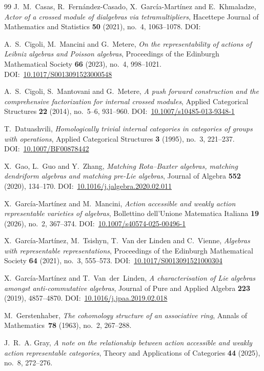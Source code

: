 \documentclass[reqno,a4paper]{amsart}
\renewcommand{\doi}[1]{DOI:~\href{https://doi.org/#1}{#1}}
\theoremstyle{plain}
\theoremstyle{definition}
\theoremstyle{remark}
\numberwithin{equation}{section}
\begin{document}
\begin{thebibliography}{99}
J.~M.~Casas, R.~Fernández-Casado, X.~García-Martínez and E.~Khmaladze, \emph{Actor of a crossed module of dialgebras via tetramultipliers}, Hacettepe Journal of Mathematics and Statistics \textbf{50} (2021), no.~4, 1063--1078. \doi{}

A.~S.~Cigoli, M.~Mancini and G.~Metere, \emph{On the representability of actions of Leibniz algebras and Poisson algebras}, Proceedings of the Edinburgh Mathematical Society \textbf{66} (2023), no.~4, 998--1021. \doi{10.1017/S0013091523000548}

A.~S.~Cigoli, S.~Mantovani and G.~Metere, \emph{A push forward construction and the comprehensive factorization for internal crossed modules}, Applied Categorical Structures \textbf{22} (2014), no.~5--6, 931--960. \doi{10.1007/s10485-013-9348-1}

T.~Datuashvili, \emph{Homologically trivial internal categories in categories of groups with operations}, Applied Categorical Structures \textbf{3} (1995), no.~3, 221--237.
\doi{10.1007/BF00878442}

X.~Gao, L.~Guo and Y.~Zhang, \emph{Matching Rota--Baxter algebras, matching dendriform algebras and matching pre-Lie algebras}, Journal of Algebra \textbf{552} (2020), 134--170. \doi{10.1016/j.jalgebra.2020.02.011}

X.~García-Martínez and M.~Mancini, \emph{Action accessible and weakly action representable varieties of algebras}, Bollettino dell'Unione Matematica Italiana \textbf{19} (2026), no.~2, 367--374. \doi{10.1007/s40574-025-00496-1}

X.~García-Martínez, M.~Tsishyn, T.~Van der Linden and C.~Vienne, \emph{Algebras with representable representations}, Proceedings of the Edinburgh Mathematical Society \textbf{64} (2021), no.~3, 555--573. \doi{10.1017/S0013091521000304}

X.~García-Martínez and T.~Van~der~Linden, \emph{A characterisation of Lie algebras amongst anti-commutative algebras}, Journal of Pure and Applied Algebra \textbf{223} (2019), 4857--4870. \doi{10.1016/j.jpaa.2019.02.018}

M.~Gerstenhaber, \emph{The cohomology structure of an associative ring}, Annals of Mathematics~\textbf{78} (1963), no.~2, 267--288.

J.~R.~A. Gray, \emph{A note on the relationship between action accessible and weakly action representable categories}, Theory and Applications of Categories \textbf{44} (2025), no.~8, 272--276.


\end{thebibliography}
\end{document}
